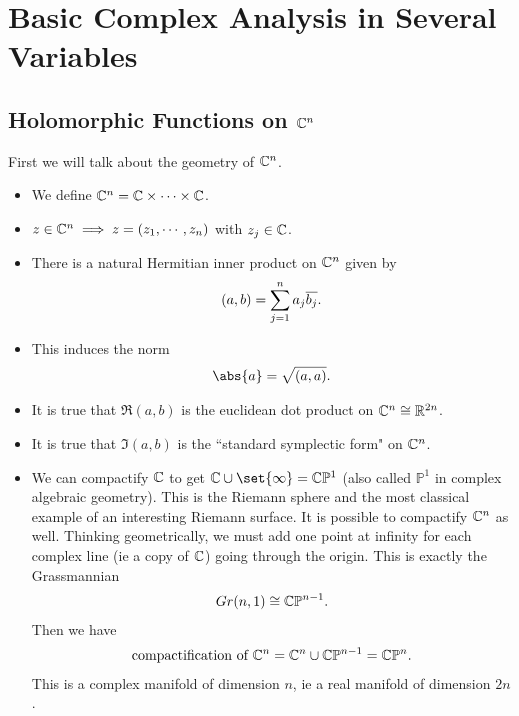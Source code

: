 
\section{Basic Complex Analysis in Several Variables}

\subsection{Holomorphic Functions on $\mathbb{C}^n$}

First we will talk about the geometry of $\mathbb{C}^n$.
\begin{remark}
    \phantom{.}
    \begin{itemize}
        \item We define $\mathbb{C}^n = \mathbb{C} \times \cdots \times \mathbb{C}$.
        \item $z \in \mathbb{C}^n \implies z = (z_1 , \cdots, z_n)$ with $z_j \in \mathbb{C}$.
        \item There is a natural Hermitian inner product on $\mathbb{C}^n$ given by
        \begin{align*}
            (a,b) = \sum_{j = 1}^n a_j \overline{b_j}.
        \end{align*}
        \item This induces the norm
        \begin{align*}
            \abs{a} = \sqrt{(a,a)}.
        \end{align*}
        \item It is true that $\Re (a,b)$ is the euclidean dot product on $\mathbb{C}^n \cong \mathbb{R}^{2n}$.
        \item It is true that $\Im (a,b)$ is the ``standard symplectic form" on $\mathbb{C}^n$.
        \item We can compactify $\mathbb{C}$ to get $\C \cup \set{\infty} = \C \mathbb{P}^1$ (also called $\mathbb{P}^1$ in complex algebraic geometry). This is the Riemann sphere and the most classical example of an interesting Riemann surface. It is possible to compactify $\mathbb{C}^n$ as well. Thinking geometrically, we must add one point at infinity for each complex line (ie a copy of $\mathbb{C}$) going through the origin. This is exactly the Grassmannian
        \begin{align*}
            Gr(n,1) \cong \mathbb{C} \mathbb{P}^{n-1}.
        \end{align*}
        Then we have
        \begin{align*}
            \text{compactification of } \mathbb{C}^n = \mathbb{C}^n \cup \mathbb{C} \mathbb{P}^{n-1} = \mathbb{C} \mathbb{P}^n.
        \end{align*}
        This is a complex manifold of dimension $n$, ie a real manifold of dimension $2n$.
    \end{itemize}
    
\end{remark}

